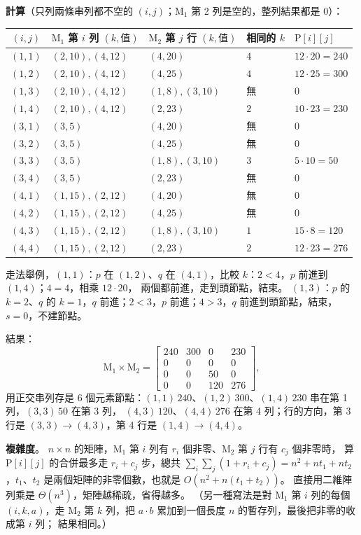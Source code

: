 \begin{pastsoln}
\textbf{計算}（只列兩條串列都不空的 $(i, j)$；$\mathrm{M}_1$ 第 2 列是空的，整列結果都是 $0$）：
\begin{center}
\small
\begin{tabular}{cllll}
\toprule
$(i, j)$ & $\mathrm{M}_1$ 第 $i$ 列 $(k, \text{值})$ & $\mathrm{M}_2$ 第 $j$ 行 $(k, \text{值})$ & 相同的 $k$ & $\mathrm{P}[i][j]$ \\
\midrule
$(1,1)$ & $(2,10), (4,12)$ & $(4,20)$ & $4$ & $12 \cdot 20 = 240$ \\
$(1,2)$ & $(2,10), (4,12)$ & $(4,25)$ & $4$ & $12 \cdot 25 = 300$ \\
$(1,3)$ & $(2,10), (4,12)$ & $(1,8), (3,10)$ & 無 & $0$ \\
$(1,4)$ & $(2,10), (4,12)$ & $(2,23)$ & $2$ & $10 \cdot 23 = 230$ \\
$(3,1)$ & $(3,5)$ & $(4,20)$ & 無 & $0$ \\
$(3,2)$ & $(3,5)$ & $(4,25)$ & 無 & $0$ \\
$(3,3)$ & $(3,5)$ & $(1,8), (3,10)$ & $3$ & $5 \cdot 10 = 50$ \\
$(3,4)$ & $(3,5)$ & $(2,23)$ & 無 & $0$ \\
$(4,1)$ & $(1,15), (2,12)$ & $(4,20)$ & 無 & $0$ \\
$(4,2)$ & $(1,15), (2,12)$ & $(4,25)$ & 無 & $0$ \\
$(4,3)$ & $(1,15), (2,12)$ & $(1,8), (3,10)$ & $1$ & $15 \cdot 8 = 120$ \\
$(4,4)$ & $(1,15), (2,12)$ & $(2,23)$ & $2$ & $12 \cdot 23 = 276$ \\
\bottomrule
\end{tabular}
\end{center}
走法舉例，$(1,1)$：$p$ 在 $(1,2)$、$q$ 在 $(4,1)$，比較 $k$：$2 < 4$，$p$ 前進到 $(1,4)$；$4 = 4$，相乘 $12 \cdot 20$，
兩個都前進，走到頭節點，結束。 $(1,3)$：$p$ 的 $k = 2$、$q$ 的 $k = 1$，$q$ 前進；$2 < 3$，$p$ 前進；$4 > 3$，$q$
前進到頭節點，結束，$s = 0$，不建節點。

結果：
\[
\mathrm{M}_1 \times \mathrm{M}_2 = \begin{bmatrix}240&300&0&230\\0&0&0&0\\0&0&50&0\\0&0&120&276\end{bmatrix},
\]
用正交串列存是 $6$ 個元素節點：$(1,1)\,240$、$(1,2)\,300$、$(1,4)\,230$ 串在第 1 列，$(3,3)\,50$ 在第 3 列，
$(4,3)\,120$、$(4,4)\,276$ 在第 4 列；行的方向，第 3 行是 $(3,3) \to (4,3)$，第 4 行是 $(1,4) \to (4,4)$。

\textbf{複雜度}。 $n \times n$ 的矩陣，$\mathrm{M}_1$ 第 $i$ 列有 $r_i$ 個非零、$\mathrm{M}_2$ 第 $j$ 行有 $c_j$ 個非零時，
算 $\mathrm{P}[i][j]$ 的合併最多走 $r_i + c_j$ 步，總共
$\sum_i \sum_j (1 + r_i + c_j) = n^2 + n t_1 + n t_2$，$t_1$、$t_2$ 是兩個矩陣的非零個數，也就是 $O(n^2 + n(t_1 + t_2))$。
直接用二維陣列乘是 $\Theta(n^3)$，矩陣越稀疏，省得越多。 （另一種寫法是對 $\mathrm{M}_1$ 第 $i$ 列的每個
$(i, k, a)$，走 $\mathrm{M}_2$ 第 $k$ 列，把 $a \cdot b$ 累加到一個長度 $n$ 的暫存列，最後把非零的收成第 $i$ 列；
結果相同。）
\end{pastsoln}
